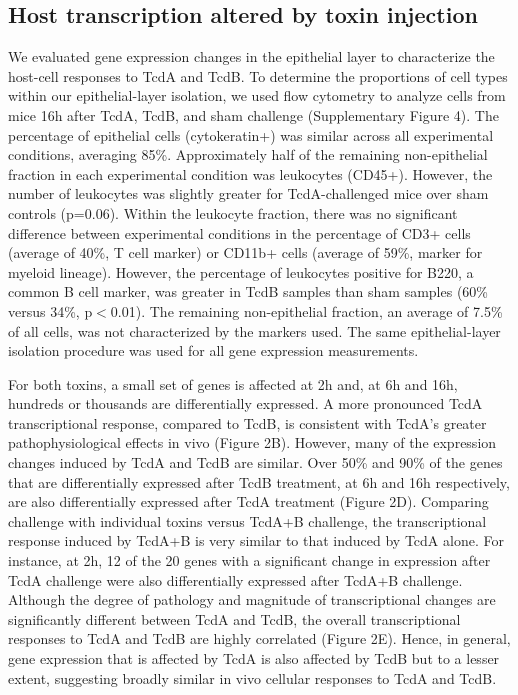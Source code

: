 \subsection{ Host transcription altered by toxin injection }
We evaluated gene expression changes in the epithelial layer to characterize the host-cell responses to TcdA and TcdB. To determine the proportions of cell types within our epithelial-layer isolation, we used flow cytometry to analyze cells from mice 16h after TcdA, TcdB, and sham challenge (Supplementary Figure 4). The percentage of epithelial cells (cytokeratin+) was similar across all experimental conditions, averaging 85\%. Approximately half of the remaining non-epithelial fraction in each experimental condition was leukocytes (CD45+). However, the number of leukocytes was slightly greater for TcdA-challenged mice over sham controls (p=0.06). Within the leukocyte fraction, there was no significant difference between experimental conditions in the percentage of CD3+ cells (average of 40\%, T cell marker) or CD11b+ cells (average of 59\%, marker for myeloid lineage). However, the percentage of leukocytes positive for B220, a common B cell marker, was greater in TcdB samples than sham samples (60\% versus 34\%, p$<$0.01). The remaining non-epithelial fraction, an average of 7.5\% of all cells, was not characterized by the markers used. The same epithelial-layer isolation procedure was used for all gene expression measurements.

For both toxins, a small set of genes is affected at 2h and, at 6h and 16h, hundreds or thousands are differentially expressed. A more pronounced TcdA transcriptional response, compared to TcdB, is consistent with TcdA’s greater pathophysiological effects in vivo (Figure 2B). However, many of the expression changes induced by TcdA and TcdB are similar. Over 50\% and 90\% of the genes that are differentially expressed after TcdB treatment, at 6h and 16h respectively, are also differentially expressed after TcdA treatment (Figure 2D). Comparing challenge with individual toxins versus TcdA+B challenge, the transcriptional response induced by TcdA+B is very similar to that induced by TcdA alone. For instance, at 2h, 12 of the 20 genes with a significant change in expression after TcdA challenge were also differentially expressed after TcdA+B challenge. Although the degree of pathology and magnitude of transcriptional changes are significantly different between TcdA and TcdB, the overall transcriptional responses to TcdA and TcdB are highly correlated (Figure 2E). Hence, in general, gene expression that is affected by TcdA is also affected by TcdB but to a lesser extent, suggesting broadly similar in vivo cellular responses to TcdA and TcdB.

